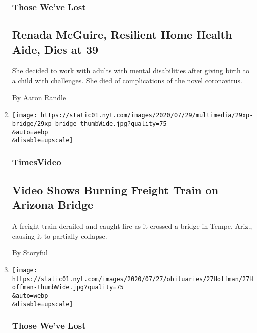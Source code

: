 \begin{enumerate}
  \hypertarget{those-weve-lost}{%
  \subsubsection{Those We've Lost}\label{those-weve-lost}}

  \hypertarget{renada-mcguire-resilient-home-health-aide-dies-at-39}{%
  \subsection{Renada McGuire, Resilient Home Health Aide, Dies at
  39}\label{renada-mcguire-resilient-home-health-aide-dies-at-39}}

  She decided to work with adults with mental disabilities after giving
  birth to a child with challenges. She died of complications of the
  novel coronavirus.

  By Aaron Randle
\item
  \href{/video/us/100000007262683/tempe-arizona-train-fire.html}{}

  \texttt{[image: https://static01.nyt.com/images/2020/07/29/multimedia/29xp-bridge/29xp-bridge-thumbWide.jpg?quality=75\\\&auto=webp\\\&disable=upscale]}

  \hypertarget{timesvideo-1}{%
  \subsubsection{TimesVideo}\label{timesvideo-1}}

  \hypertarget{video-shows-burning-freight-train-on-arizona-bridge}{%
  \subsection{Video Shows Burning Freight Train on Arizona
  Bridge}\label{video-shows-burning-freight-train-on-arizona-bridge}}

  A freight train derailed and caught fire as it crossed a bridge in
  Tempe, Ariz., causing it to partially collapse.

  By Storyful
\item
  \href{/2020/07/29/obituaries/katherine-hoffman-dead-coronavirus.html}{}

  \texttt{[image: https://static01.nyt.com/images/2020/07/27/obituaries/27Hoffman/27Hoffman-thumbWide.jpg?quality=75\\\&auto=webp\\\&disable=upscale]}

  \hypertarget{those-weve-lost-1}{%
  \subsubsection{Those We've Lost}\label{those-weve-lost-1}}


\end{enumerate}
